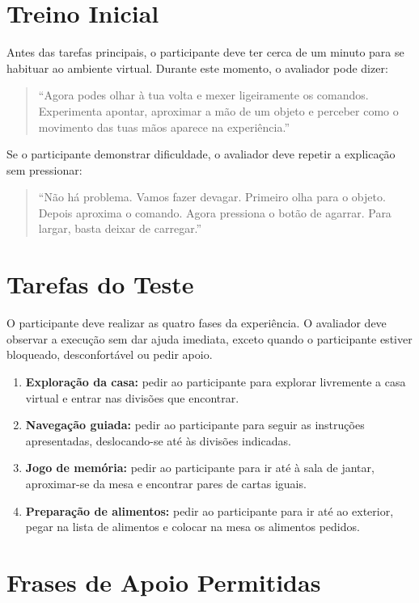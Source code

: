 \documentclass[12pt,a4paper,oneside]{report}
\begin{document}
\section{Treino Inicial}

Antes das tarefas principais, o participante deve ter cerca de um minuto para se habituar ao ambiente virtual. Durante este momento, o avaliador pode dizer:

\begin{quote}
    ``Agora podes olhar à tua volta e mexer ligeiramente os comandos. Experimenta apontar, aproximar a mão de um objeto e perceber como o movimento das tuas mãos aparece na experiência.''
\end{quote}

Se o participante demonstrar dificuldade, o avaliador deve repetir a explicação sem pressionar:

\begin{quote}
    ``Não há problema. Vamos fazer devagar. Primeiro olha para o objeto. Depois aproxima o comando. Agora pressiona o botão de agarrar. Para largar, basta deixar de carregar.''
\end{quote}

\section{Tarefas do Teste}

O participante deve realizar as quatro fases da experiência. O avaliador deve observar a execução sem dar ajuda imediata, exceto quando o participante estiver bloqueado, desconfortável ou pedir apoio.

\begin{enumerate}
    \item \textbf{Exploração da casa:} pedir ao participante para explorar livremente a casa virtual e entrar nas divisões que encontrar.
    \item \textbf{Navegação guiada:} pedir ao participante para seguir as instruções apresentadas, deslocando-se até às divisões indicadas.
    \item \textbf{Jogo de memória:} pedir ao participante para ir até à sala de jantar, aproximar-se da mesa e encontrar pares de cartas iguais.
    \item \textbf{Preparação de alimentos:} pedir ao participante para ir até ao exterior, pegar na lista de alimentos e colocar na mesa os alimentos pedidos.
\end{enumerate}

\section{Frases de Apoio Permitidas}
\end{document}
